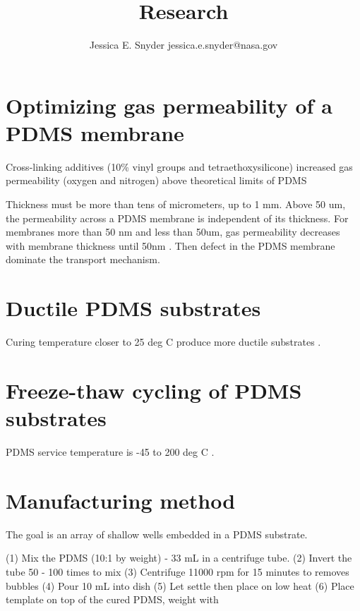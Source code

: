 \documentclass[a4paper, 11pt]{article}
\begin{document}
\author{Jessica E. Snyder jessica.e.snyder@nasa.gov}
\title{ Research}
\maketitle

\tableofcontents


\section{Optimizing gas permeability of a PDMS membrane}

Cross-linking additives (10\% vinyl groups and tetraethoxysilicone) increased gas permeability (oxygen and nitrogen) above theoretical limits of PDMS  \cite{rao2007preparation}

Thickness must be more than tens of micrometers, up to 1 mm. Above 50 um, the permeability across a PDMS membrane is independent of its thickness. For membranes more than 50 nm and less than 50um, gas permeability decreases with membrane thickness until 50nm \cite{firpo2015permeability}. Then defect in the PDMS membrane dominate the transport mechanism. 

\section{Ductile PDMS substrates}
Curing temperature closer to 25 deg C produce more ductile substrates \cite{johnston2014mechanical}. 

\section{Freeze-thaw cycling of PDMS substrates}
PDMS service temperature is -45 to 200 deg C \cite{Slygard184ProductSheet}.

\section{Manufacturing method}

The goal is an array of shallow wells embedded in a PDMS substrate. 

(1) Mix the PDMS (10:1 by weight) - 33 mL in a centrifuge tube. 
(2) Invert the tube 50 - 100 times to mix
(3) Centrifuge 11000 rpm for 15 minutes to removes bubbles 
(4) Pour 10 mL into dish
(5) Let settle then place on low heat 
(6) Place template on top of the cured PDMS, weight with 

 

\end{document}
